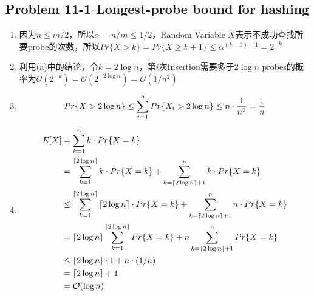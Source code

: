 \subsection*{Problem 11-1 Longest-probe bound for hashing}
\begin{enumerate}
	\item	因为$n \leq m /2$，所以$\alpha = n / m \leq 1 / 2$，Random Variable $X$表示不成功查找所要probe的次数，所以$Pr\{X > k\} = Pr\{X \geq k + 1\} \leq {\alpha}^{(k + 1) - 1} = 2^{-k}$
	\item	利用(a)中的结论，令$k = 2\log{n}$，第$i$次Insertion需要多于$2\log{n}$ probes的概率为$\mathcal{O}(2^{-k}) = \mathcal{O}(2^{-2\log{n}}) = \mathcal{O}(1 / n^2)$
	\item	\begin{equation} \notag
			Pr\{X > 2 \log{n}\} \leq \sum_{i = 1}^{n} Pr\{X_i > 2 \log{n}\} \leq n \cdot \frac{1}{n^2} = \frac{1}{n}
		\end{equation}
	\item	\begin{equation} \notag
		\begin{aligned}
			E[X]	& = \sum_{k = 1}^{n} k \cdot Pr\{X = k\} \\
				& = \sum_{k = 1}^{\left\lceil 2 \log{n} \right\rceil} k \cdot Pr\{X = k\} + \sum_{k = \left\lceil 2 \log{n} \right\rceil + 1}^{n} k \cdot Pr\{X = k\} \\
				& \leq \sum_{k = 1}^{\left\lceil 2 \log{n} \right\rceil} \left\lceil 2 \log{n} \right\rceil \cdot Pr\{X = k\} + \sum_{k = \left\lceil 2 \log{n} \right\rceil + 1}^{n} n \cdot Pr\{X = k\} \\
				& = \left\lceil 2 \log{n} \right\rceil \sum_{k = 1}^{\left\lceil 2 \log{n} \right\rceil} Pr\{X = k\} + n \sum_{k = \left\lceil 2 \log{n} \right\rceil + 1}^{n} Pr\{X = k\} \\
				& \leq \left\lceil 2 \log{n} \right\rceil \cdot 1 + n \cdot (1 / n) \\
				& = \left\lceil 2 \log{n} \right\rceil + 1 \\
				& = \mathcal{O}(\log{n})
		\end{aligned}
		\end{equation}
\end{enumerate}

